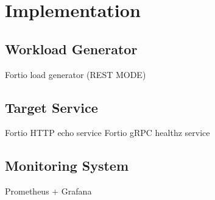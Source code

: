 \section{Implementation}
\label{sec:system:implementation}

\subsection{Workload Generator}
\label{sec:system:workload-generator}

Fortio load generator (REST MODE)

\subsection{Target Service}
\label{sec:system:target-service}

Fortio HTTP echo service
Fortio gRPC healthz service

\subsection{Monitoring System}
\label{sec:system:monitoring-system}

Prometheus + Grafana